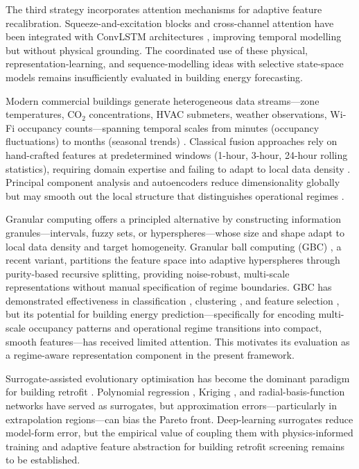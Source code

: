 \documentclass[11pt]{article}
\begin{document}
The third strategy incorporates attention mechanisms for adaptive feature recalibration. Squeeze-and-excitation blocks \cite{39} and cross-channel attention have been integrated with ConvLSTM architectures \cite{40}, improving temporal modelling but without physical grounding. The coordinated use of these physical, representation-learning, and sequence-modelling ideas with selective state-space models remains insufficiently evaluated in building energy forecasting.

Modern commercial buildings generate heterogeneous data streams---zone temperatures, CO$_2$ concentrations, HVAC submeters, weather observations, Wi-Fi occupancy counts---spanning temporal scales from minutes (occupancy fluctuations) to months (seasonal trends) \cite{41}. Classical fusion approaches rely on hand-crafted features at predetermined windows (1-hour, 3-hour, 24-hour rolling statistics), requiring domain expertise and failing to adapt to local data density \cite{42}. Principal component analysis and autoencoders reduce dimensionality globally but may smooth out the local structure that distinguishes operational regimes \cite{43}.

Granular computing \cite{44,45} offers a principled alternative by constructing information granules---intervals, fuzzy sets, or hyperspheres---whose size and shape adapt to local data density and target homogeneity. Granular ball computing (GBC) \cite{46}, a recent variant, partitions the feature space into adaptive hyperspheres through purity-based recursive splitting, providing noise-robust, multi-scale representations without manual specification of regime boundaries. GBC has demonstrated effectiveness in classification \cite{46}, clustering \cite{47}, and feature selection \cite{48}, but its potential for building energy prediction---specifically for encoding multi-scale occupancy patterns and operational regime transitions into compact, smooth features---has received limited attention. This motivates its evaluation as a regime-aware representation component in the present framework.

Surrogate-assisted evolutionary optimisation has become the dominant paradigm for building retrofit \cite{26,27}. Polynomial regression \cite{49}, Kriging \cite{50}, and radial-basis-function networks \cite{51} have served as surrogates, but approximation errors---particularly in extrapolation regions---can bias the Pareto front. Deep-learning surrogates \cite{52} reduce model-form error, but the empirical value of coupling them with physics-informed training and adaptive feature abstraction for building retrofit screening remains to be established.
\end{document}
